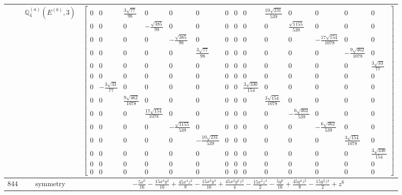 \documentclass[fleqn,8pt,landscape]{jsarticle}
\begin{document}
\begin{longtable}{ccc}
$  $ & $ \mathbb{Q}_{4}^{(a)}(E^{(b)},3) $ & $ \begin{bmatrix} 0 & 0 & \frac{3 \sqrt{77}}{98} & 0 & 0 & 0 & 0 & 0 & 0 & \frac{10 \sqrt{231}}{539} & 0 & 0 & 0 & 0 \\ 0 & 0 & 0 & - \frac{\sqrt{385}}{98} & 0 & 0 & 0 & 0 & 0 & 0 & \frac{\sqrt{1155}}{539} & 0 & 0 & 0 \\ 0 & 0 & 0 & 0 & - \frac{\sqrt{385}}{98} & 0 & 0 & 0 & 0 & 0 & 0 & - \frac{17 \sqrt{154}}{1078} & 0 & 0 \\ 0 & 0 & 0 & 0 & 0 & \frac{3 \sqrt{77}}{98} & 0 & 0 & 0 & 0 & 0 & 0 & - \frac{9 \sqrt{462}}{1078} & 0 \\ 0 & 0 & 0 & 0 & 0 & 0 & 0 & 0 & 0 & 0 & 0 & 0 & 0 & \frac{3 \sqrt{33}}{77} \\ 0 & 0 & 0 & 0 & 0 & 0 & 0 & 0 & 0 & 0 & 0 & 0 & 0 & 0 \\ 0 & - \frac{3 \sqrt{33}}{77} & 0 & 0 & 0 & 0 & 0 & 0 & \frac{3 \sqrt{330}}{154} & 0 & 0 & 0 & 0 & 0 \\ 0 & 0 & \frac{9 \sqrt{462}}{1078} & 0 & 0 & 0 & 0 & 0 & 0 & \frac{3 \sqrt{154}}{1078} & 0 & 0 & 0 & 0 \\ 0 & 0 & 0 & \frac{17 \sqrt{154}}{1078} & 0 & 0 & 0 & 0 & 0 & 0 & - \frac{6 \sqrt{462}}{539} & 0 & 0 & 0 \\ 0 & 0 & 0 & 0 & - \frac{\sqrt{1155}}{539} & 0 & 0 & 0 & 0 & 0 & 0 & - \frac{6 \sqrt{462}}{539} & 0 & 0 \\ 0 & 0 & 0 & 0 & 0 & - \frac{10 \sqrt{231}}{539} & 0 & 0 & 0 & 0 & 0 & 0 & \frac{3 \sqrt{154}}{1078} & 0 \\ 0 & 0 & 0 & 0 & 0 & 0 & 0 & 0 & 0 & 0 & 0 & 0 & 0 & \frac{3 \sqrt{330}}{154} \\ 0 & 0 & 0 & 0 & 0 & 0 & 0 & 0 & 0 & 0 & 0 & 0 & 0 & 0 \\ 0 & 0 & 0 & 0 & 0 & 0 & 0 & 0 & 0 & 0 & 0 & 0 & 0 & 0 \end{bmatrix} $ \\ \hline
$ 844 $ & $ \text{symmetry} $ & $ - \frac{5 x^{6}}{16} - \frac{15 x^{4} y^{2}}{16} + \frac{45 x^{4} z^{2}}{8} - \frac{15 x^{2} y^{4}}{16} + \frac{45 x^{2} y^{2} z^{2}}{4} - \frac{15 x^{2} z^{4}}{2} - \frac{5 y^{6}}{16} + \frac{45 y^{4} z^{2}}{8} - \frac{15 y^{2} z^{4}}{2} + z^{6} $ \\

\end{longtable}
\end{document}
